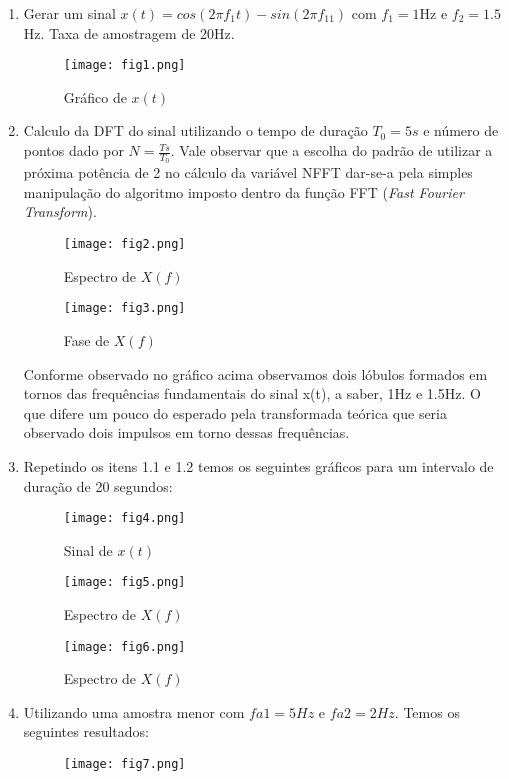 \documentclass[a4paper]{article}
\begin{document}
		\begin{enumerate} 
			\item Gerar um sinal $x(t) = cos(2\pi f_1t)-sin(2\pi f_11)$ com $f_1=1$Hz e $f_2 = 1.5$Hz. Taxa de amostragem de 20Hz.
			\begin{figure}[!hb]
				\centering
				\texttt{[image: fig1.png]}
				\caption{Gráfico de $x(t)$}
				\label{fig1}
			\end{figure}
			\item Calculo da DFT do sinal utilizando o tempo de duração $T_0 = 5s$ e número de pontos dado por $N = \frac{Ts}{T_0}$. Vale observar que a escolha do padrão de utilizar a próxima potência de 2 no cálculo da variável NFFT dar-se-a pela simples manipulação do algoritmo imposto dentro da função FFT (\textit{Fast Fourier Transform}). 
			\begin{figure}[!h]
				\centering
				\texttt{[image: fig2.png]}
				\caption{Espectro de $X(f)$}
				\label{fig2}
			\end{figure}
			\begin{figure}[!hr]
				\centering
				\texttt{[image: fig3.png]}
				\caption{Fase de $X(f)$}
				\label{fig3}
			\end{figure}
			Conforme observado no gráfico acima observamos dois lóbulos formados em tornos das frequências fundamentais do sinal x(t), a saber, 1Hz e 1.5Hz. O que difere um pouco do esperado pela transformada teórica que seria observado dois impulsos em torno dessas frequências.
			\item Repetindo os itens 1.1 e 1.2 temos os seguintes gráficos para um intervalo de duração de 20 segundos:
			\begin{figure}[!hr]
				\centering
				\texttt{[image: fig4.png]}
				\caption{Sinal de $x(t)$}
				\label{fig4}
			\end{figure}
			\begin{figure}[!hl]
				\centering
				\texttt{[image: fig5.png]}
				\caption{Espectro de $X(f)$}
				\label{fig5}
			\end{figure}
			\begin{figure}[!hr]
				\centering
				\texttt{[image: fig6.png]}
				\caption{Espectro de $X(f)$}
				\label{fig6}
			\end{figure}
			\item Utilizando uma amostra menor com $fa1 = 5Hz$ e $fa2 = 2Hz.$ Temos os seguintes resultados:
			\begin{figure}[!hr]
				\centering
				\texttt{[image: fig7.png]}

\end{figure}
\end{enumerate}
\end{document}
